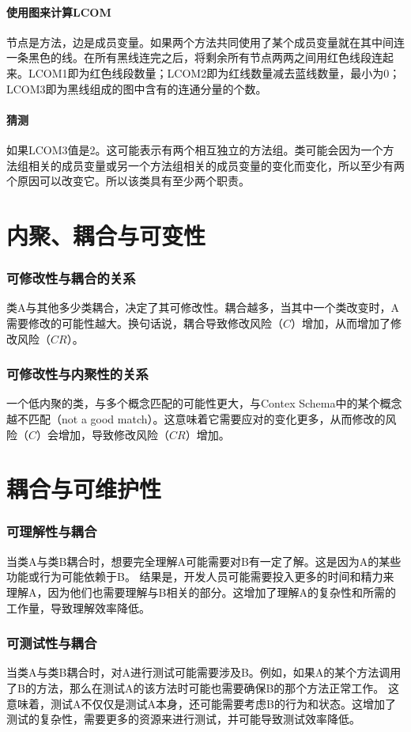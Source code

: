 \paragraph{使用图来计算LCOM}节点是方法，边是成员变量。如果两个方法共同使用了某个成员变量就在其中间连一条黑色的线。在所有黑线连完之后，将剩余所有节点两两之间用红色线段连起来。LCOM1即为红色线段数量；LCOM2即为红线数量减去蓝线数量，最小为0；LCOM3即为黑线组成的图中含有的连通分量的个数。

\paragraph{猜测}如果LCOM3值是2。这可能表示有两个相互独立的方法组。类可能会因为一个方法组相关的成员变量或另一个方法组相关的成员变量的变化而变化，所以至少有两个原因可以改变它。所以该类具有至少两个职责。

\section{内聚、耦合与可变性}

\subsubsection{可修改性与耦合的关系}
类A与其他多少类耦合，决定了其可修改性。耦合越多，当其中一个类改变时，A需要修改的可能性越大。换句话说，耦合导致修改风险（$C$）增加，从而增加了修改风险（$CR$）。

\subsubsection{可修改性与内聚性的关系}
一个低内聚的类，与多个概念匹配的可能性更大，与Contex Schema中的某个概念越不匹配（not a good match）。这意味着它需要应对的变化更多，从而修改的风险（$C$）会增加，导致修改风险（$CR$）增加。

\section{耦合与可维护性}
\subsubsection{可理解性与耦合}
当类A与类B耦合时，想要完全理解A可能需要对B有一定了解。这是因为A的某些功能或行为可能依赖于B。
结果是，开发人员可能需要投入更多的时间和精力来理解A，因为他们也需要理解与B相关的部分。这增加了理解A的复杂性和所需的工作量，导致理解效率降低。

\subsubsection{可测试性与耦合}
当类A与类B耦合时，对A进行测试可能需要涉及B。例如，如果A的某个方法调用了B的方法，那么在测试A的该方法时可能也需要确保B的那个方法正常工作。
这意味着，测试A不仅仅是测试A本身，还可能需要考虑B的行为和状态。这增加了测试的复杂性，需要更多的资源来进行测试，并可能导致测试效率降低。

